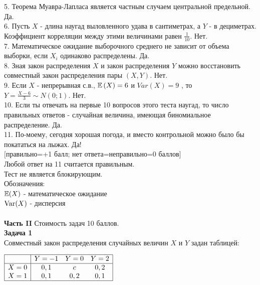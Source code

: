 \documentclass[12pt, a4paper]{article}\usepackage[]{graphicx}\usepackage[]{color}
\begin{document}
5. Теорема Муавра-Лапласа является частным случаем центральной
предельной. Да. \\

6. Пусть $X$ - длина наугад выловленного удава в сантиметрах, а
$Y$ - в дециметрах. Коэффициент корреляции между этими
величинами равен $\frac{1}{10}$. Нет. \\

7. Математическое ожидание выборочного среднего не зависит от
объема выборки, если $X_{i}$ одинаково распределены. Да.  \\

8. Зная закон распределения $X$ и закон распределения $Y$
можно восстановить совместный закон распределения пары $(X,Y)$. Нет. \\

9. Если  $X$  - непрерывная с.в.,  $\mathbb{E}\left(X\right)=6$  и
$Var\left(X\right)=9$ , то  $Y=\frac{X-6}{3} \sim
N\left(0;1\right)$.  Нет. \\

10. Если ты отвечать на первые 10 вопросов этого теста наугад, то
число правильных ответов - случайная величина, имеющая
биномиальное распределение. Да.  \\

11. По-моему, сегодня хорошая погода, и вместо контрольной можно
было бы покататься на лыжах. Да! \\


$[$правильно=+1 балл; нет ответа=неправильно=0 баллов$]$ \\
Любой ответ на 11 считается правильным. \\
Тест не является блокирующим. \\
Обозначения: \\
$\mathbb{E}(X)$ - математическое ожидание \\
$\operatorname{Var}(X)$ - дисперсия \\ \\


\textbf{Часть II} Стоимость задач 10 баллов. \\


\textbf{Задача 1} \\ %
Совместный закон распределения случайных величин  $X$  и  $Y$
задан таблицей:

$\begin{array}{|c|ccc|} \hline {} & {Y=-1} & {Y=0} & {Y=2}
\\  \hline {X=0} & {0,1} & {c} & {0,2}
\\ {X=1} & {0,1} & {0,2} & {0,1} \\  \hline  \end{array}$
\end{document}
